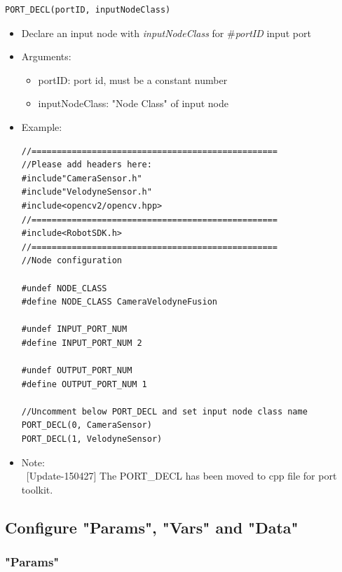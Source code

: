 \documentclass[a4paper,10pt]{book}
\begin{document}
\begin{mdframed}
\begin{verbatim}
PORT_DECL(portID, inputNodeClass)
\end{verbatim}
\begin{itemize}
 \item Declare an input node with {\em{inputNodeClass}} for \#{\em{portID}} input port
 \item Arguments:
 \begin{itemize}
  \item portID: port id, must be a constant number
  \item inputNodeClass: "Node Class" of input node
 \end{itemize}
 \item Example:
 \begin{verbatim}
//=================================================
//Please add headers here:
#include"CameraSensor.h"
#include"VelodyneSensor.h"
#include<opencv2/opencv.hpp>
//=================================================
#include<RobotSDK.h>
//=================================================
//Node configuration

#undef NODE_CLASS
#define NODE_CLASS CameraVelodyneFusion

#undef INPUT_PORT_NUM
#define INPUT_PORT_NUM 2

#undef OUTPUT_PORT_NUM
#define OUTPUT_PORT_NUM 1

//Uncomment below PORT_DECL and set input node class name
PORT_DECL(0, CameraSensor)
PORT_DECL(1, VelodyneSensor)
 \end{verbatim}
 \item Note: \\~[Update-150427] The PORT\_DECL has been moved to cpp file for port toolkit.
\end{itemize}
\end{mdframed}

\subsection{Configure "Params", "Vars" and "Data"}

\subsubsection{"Params"}
\end{document}
